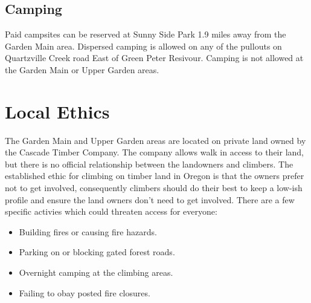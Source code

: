 \subsection*{Camping}
Paid campsites can be reserved at Sunny Side Park 1.9 miles away from the Garden Main area. Dispersed camping is allowed on any of the pullouts on Quartzville Creek road East of Green Peter Resivour. Camping is not allowed at the Garden Main or Upper Garden areas.
\section{Local Ethics}
The Garden Main and Upper Garden areas are located on private land owned by the Cascade Timber Company. The company allows walk in access to their land, but there is no official relationship between the landowners and climbers. The established ethic for climbing on timber land in Oregon is that the owners prefer not to get involved, consequently climbers should do their best to keep a low-ish profile and ensure the land owners don't need to get involved. There are a few specific activies which could threaten access for everyone:\\
\begin{itemize}
\item Building fires or causing fire hazards.\\
\item Parking on or blocking gated forest roads.\\
\item Overnight camping at the climbing areas.\\
\item Failing to obay posted fire closures.\\
\end{itemize}
